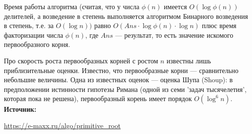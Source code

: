 \documentclass[12pt,a4paper]{scrartcl}
\begin{document}
Время работы алгоритма (считая, что у числа $\phi(n)$ имеется $O \left( \log \phi(n) \right)$ делителей, а возведение в степень выполняется алгоритмом Бинарного возведения в степень, т.е. за $O(\log n))$ равно $O \left( Ans \cdot \log \phi(n) \cdot \log n \right)$ плюс время факторизации числа $\phi(n)$, где $Ans$ — результат, то есть значение искомого первообразного корня.

Про скорость роста первообразных корней с ростом $n$ известны лишь приблизительные оценки. Известно, что первообразные корни — сравнительно небольшие величины. Одна из известных оценок — оценка Шупа (Shoup): в предположении истинности гипотезы Римана (одной из семи 'задач тысячелетия', которая пока не решена), первообразный корень имеет порядок $O (\log^6 n)$.\\

\textbf{Источник:}

\href{https://e-maxx.ru/algo/primitive_root}{https://e-maxx.ru/algo/primitive\_root}
	
\end{document}
